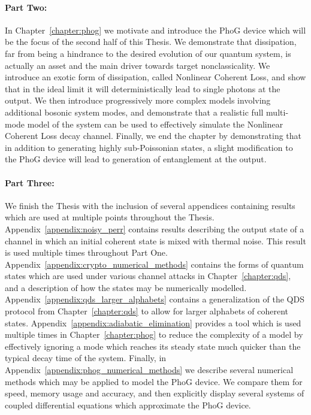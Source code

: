 \paragraph{Part Two:} In Chapter~\ref{chapter:phog} we motivate and introduce the PhoG device which will be the focus of the second half of this Thesis. We demonstrate that dissipation, far from being a hindrance to the desired evolution of our quantum system, is actually an asset and the main driver towards target nonclassicality. We introduce an exotic form of dissipation, called Nonlinear Coherent Loss, and show that in the ideal limit it will deterministically lead to single photons at the output. We then introduce progressively more complex models involving additional bosonic system modes, and demonstrate that a realistic full multi-mode model of the system can be used to effectively simulate the Nonlinear Coherent Loss decay channel. Finally, we end the chapter by demonstrating that in addition to generating highly sub-Poissonian states, a slight modification to the PhoG device will lead to generation of entanglement at the output.

\paragraph{Part Three:} We finish the Thesis with the inclusion of several appendices containing results which are used at multiple points throughout the Thesis.  Appendix~\ref{appendix:noisy_perr} contains results describing the output state of a channel in which an initial coherent state is mixed with thermal noise. This result is used multiple times throughout Part One. Appendix~\ref{appendix:crypto_numerical_methods} contains the forms of quantum states which are used under various channel attacks in Chapter~\ref{chapter:qds}, and a description of how the states may be numerically modelled. Appendix~\ref{appendix:qds_larger_alphabets} contains a generalization of the QDS protocol from Chapter~\ref{chapter:qds} to allow for larger alphabets of coherent states.  Appendix~\ref{appendix:adiabatic_elimination} provides a tool which is used multiple times in Chapter~\ref{chapter:phog} to reduce the complexity of a model by effectively ignoring a mode which reaches its steady state much quicker than the typical decay time of the system. Finally, in Appendix~\ref{appendix:phog_numerical_methods} we describe several numerical methods which may be applied to model the PhoG device. We compare them for speed, memory usage and accuracy, and then explicitly display several systems of coupled differential equations which approximate the PhoG device. 

